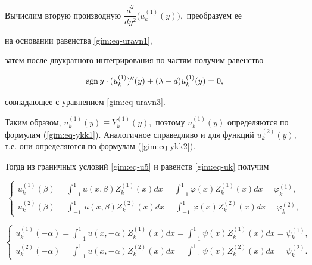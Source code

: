 Вычислим вторую производную $\dfrac{d^2}{dy^2}\bigl(u_k^{(1)}(y)\bigr),$ преобразуем ее

на основании равенства \eqref{gim:eq-uravn1},

затем после двукратного интегрирования по частям получим равенство

$$

\mathop{\rm sgn}y\cdot (u_k^{(1)})''(y)+(\lambda-d) u_k^{(1)}(y)=0,

$$

совпадающее с уравнением \eqref{gim:eq-uravn3}. 

Таким образом, $u_k^{(1)}(y)\equiv Y_k^{(1)}(y),$ поэтому $u_k^{(1)}(y)$ определяются по формулам (\ref{gim:eq-ykk1}). Аналогичное справедливо и для функций $u_k^{(2)}(y),$ т.е. они определяются по формулам (\ref{gim:eq-ykk2}).



Тогда из граничных условий \eqref{gim:eq-u5} и равенств \eqref{gim:eq-uk} получим

\begin{equation}

\begin{cases}

\displaystyle

u_k^{(1)}(\beta)=

\int _{-1}^1 u(x,\beta)Z_k^{(1)}(x)dx=\int _{-1}^1 \varphi(x)Z_k^{(1)}(x)dx=\varphi_k^{(1)},\\

\displaystyle

u_k^{(2)}(\beta)=\int _{-1}^1\,u(x,\beta)Z_k^{(2)}(x)dx=

\int _{-1}^1\,\varphi(x)Z_k^{(2)}(x)dx=\varphi_k^{(2)},

\end{cases}

\label{gim:eq-uka}

\end{equation}

\begin{equation}

\begin{cases}

\displaystyle

u_k^{(1)}(-\alpha)= \int _{-1}^1 u(x,-\alpha)Z_k^{(1)}(x)dx=\int _{-1}^1 \psi(x)Z_k^{(1)}(x)dx=\psi_k^{(1)},\\

\displaystyle 

u_k^{(2)}(-\alpha)=\int _{-1}^1 u(x,-\alpha)Z_k^{(2)}(x)dx= \int _{-1}^1 \psi(x)Z_k^{(2)}(x)dx=\psi_k^{(2)}.

\end{cases}

\label{gim:eq-ukb}

\end{equation}



